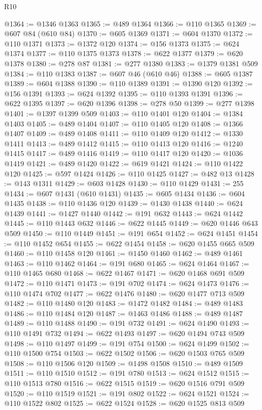 \begin{lexlean}{R10}
\begin{coremodule}
{{{{{{{{{{{{{{{{{{{{{{{{{{{{{{{{{{{{{{{{{{{{{{{{{{{{{{{{{{{{{{{{{{{{{{{{{{{{{{{{{{{{@1364 := @1346 @1363
@1365 := @489 @1364
@1366 := @110 @1365
@1369 := @607 @84 (@610 @84)
@1370 := @605 @1369
@1371 := @604 @1370
@1372 := @110 @1371
@1373 := @1372 @120
@1374 := @156 @1373
@1375 := @624 @1374
@1377 := @110 @1375 @1373
@1378 := @622 @1377
@1379 := @620 @1378
@1380 := @278 @87
@1381 := @277 @1380
@1383 := @1379 @1381 @509
@1384 := @110 @1383
@1387 := @607 @46 (@610 @46)
@1388 := @605 @1387
@1389 := @604 @1388
@1390 := @110 @1389
@1391 := @1390 @120
@1392 := @156 @1391
@1393 := @624 @1392
@1395 := @110 @1393 @1391
@1396 := @622 @1395
@1397 := @620 @1396
@1398 := @278 @50
@1399 := @277 @1398
@1401 := @1397 @1399 @509
@1403 := @110 @1401 @120
@1404 := @1384 @1403
@1405 := @489 @1404
@1407 := @110 @1405 @120
@1408 := @1366 @1407
@1409 := @489 @1408
@1411 := @110 @1409 @120
@1412 := @1330 @1411
@1413 := @489 @1412
@1415 := @110 @1413 @120
@1416 := @1240 @1415
@1417 := @489 @1416
@1419 := @110 @1417 @120
@1420 := @1036 @1419
@1421 := @489 @1420
@1422 := @619 @1421
@1424 := @110 @1422 @120
@1425 := @597 @1424
@1426 := @110 @1425
@1427 := @482 @13
@1428 := @143 @1311
@1429 := @603 @1428
@1430 := @110 @1429
@1431 := 255
@1434 := @607 @1431 (@610 @1431)
@1435 := @605 @1434
@1436 := @604 @1435
@1438 := @110 @1436 @120
@1439 := @1430 @1438
@1440 := @624 @1439
@1441 := @1427 @1440
@1442 := @191 @632
@1443 := @624 @1442
@1445 := @110 @1443 @632
@1446 := @622 @1445
@1449 := @620 @1446 @643 @509
@1450 := @110 @1449
@1451 := @191 @654
@1452 := @624 @1451
@1454 := @110 @1452 @654
@1455 := @622 @1454
@1458 := @620 @1455 @665 @509
@1460 := @110 @1458 @120
@1461 := @1450 @1460
@1462 := @489 @1461
@1463 := @110 @1462
@1464 := @191 @680
@1465 := @624 @1464
@1467 := @110 @1465 @680
@1468 := @622 @1467
@1471 := @620 @1468 @691 @509
@1472 := @110 @1471
@1473 := @191 @702
@1474 := @624 @1473
@1476 := @110 @1474 @702
@1477 := @622 @1476
@1480 := @620 @1477 @713 @509
@1482 := @110 @1480 @120
@1483 := @1472 @1482
@1484 := @489 @1483
@1486 := @110 @1484 @120
@1487 := @1463 @1486
@1488 := @489 @1487
@1489 := @110 @1488
@1490 := @191 @732
@1491 := @624 @1490
@1493 := @110 @1491 @732
@1494 := @622 @1493
@1497 := @620 @1494 @743 @509
@1498 := @110 @1497
@1499 := @191 @754
@1500 := @624 @1499
@1502 := @110 @1500 @754
@1503 := @622 @1502
@1506 := @620 @1503 @765 @509
@1508 := @110 @1506 @120
@1509 := @1498 @1508
@1510 := @489 @1509
@1511 := @110 @1510
@1512 := @191 @780
@1513 := @624 @1512
@1515 := @110 @1513 @780
@1516 := @622 @1515
@1519 := @620 @1516 @791 @509
@1520 := @110 @1519
@1521 := @191 @802
@1522 := @624 @1521
@1524 := @110 @1522 @802
@1525 := @622 @1524
@1528 := @620 @1525 @813 @509
}}}}}}}}}}}}}}}}}}}}}}}}}}}}}}}}}}}}}}}}}}}}}}}}}}}}}}}}}}}}}}}}}}}}}}}}}}}}}}}}}}}}
\end{coremodule}
\end{lexlean}
